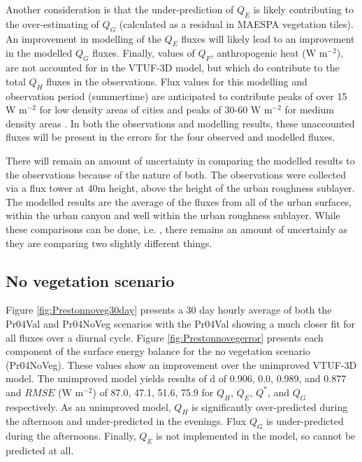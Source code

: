 \documentclass[final,3p,times,authoryear]{elsarticle}
\begin{document}
Another consideration is that the under-prediction of $Q_{E}$ is likely contributing to the over-estimating of $Q_{G}$ (calculated as a residual in MAESPA vegetation tiles). An improvement in modelling of the $Q_{E}$ fluxes will likely lead to an improvement in the modelled $Q_{G}$ fluxes. Finally, values of $Q_{F}$, anthropogenic heat (W m$^{-2}$), are not accounted for in the VTUF-3D model, but which do contribute to the total $Q_{H}$ fluxes in the observations. Flux values for this modelling and observation period (summertime) are anticipated to contribute peaks of over 15 W m$^{-2}$ for low density areas of cities and peaks of 30-60 W m$^{-2}$ for medium density areas \citep{Sailor2004}. In both the observations and modelling results, these unaccounted fluxes will be present in the errors for the four observed and modelled fluxes.

There will remain an amount of uncertainty in comparing the modelled results to the observations because of the nature of both. The observations were collected via a flux tower at 40m height, above the height of the urban roughness sublayer. The modelled results are the average of the fluxes from all of the urban surfaces, within the urban canyon and well within the urban roughness sublayer. While these comparisons can be done, i.e. \cite{Grimmond2011}, there remains an amount of uncertainly as they are comparing two slightly different things. 

\subsection{No vegetation scenario}\label{sec:baselinenoveg}

Figure \ref{fig:Prestonnoveg30day} presents a 30 day hourly average of both the Pr04Val and Pr04NoVeg scenarios with the Pr04Val showing a much closer fit for all fluxes over a diurnal cycle. Figure \ref{fig:Prestonnovegerror} presents each component of the surface energy balance for the no vegetation scenario (Pr04NoVeg). These values show an improvement over the unimproved VTUF-3D model. The unimproved model yields results of d of 0.906, 0.0, 0.989, and 0.877 and $RMSE$ (W m$^{-2}$) of 87.0, 47.1, 51.6, 75.9 for $Q_{H}$, $Q_{E}$, $Q^{*}$, and $Q_{G}$ respectively. As an unimproved model, $Q_{H}$ is significantly over-predicted during the afternoon and under-predicted in the evenings. Flux $Q_{G}$ is under-predicted during the afternoons. Finally, $Q_{E}$ is not implemented in the model, so cannot be predicted at all. 
\end{document}
